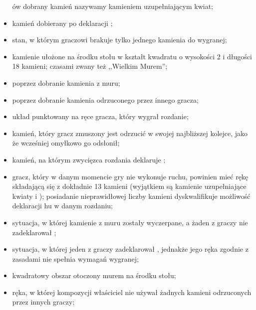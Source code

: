 \begin{itemize}
ów dobrany kamień nazywamy kamieniem uzupełniającym kwiat;
\item {}
kamień dobierany po deklaracji ;
\item {}
stan, w którym graczowi brakuje tylko jednego kamienia do wygranej;
\item {}
kamienie ułożone na środku stołu w kształt kwadratu o wysokości 2 i długości 18
kamieni; czasami zwany też ,,Wielkim Murem'';
\item {}
\hu  poprzez dobranie kamienia z muru;
\item {}
\hu  poprzez dobranie kamienia odrzuconego przez innego gracza;
\item {}
układ punktowany na ręce gracza, który wygrał rozdanie;
\item {}
kamień, który gracz zmuszony jest odrzucić w swojej najbliższej kolejce, jako że
wcześniej omyłkowo go odsłonił;
\item {}
kamień, na którym zwycięzca rozdania deklaruje \hu; 
\item {}
gracz, który w danym momencie gry nie wykonuje ruchu, powinien mieć rękę
składającą się z dokładnie 13 kamieni (wyjątkiem są kamienie uzupełniające
kwiaty i ); posiadanie nieprawidłowej liczby kamieni
dyskwalifikuje możliwość deklaracji hu w danym rozdaniu;
\item {}
sytuacja, w której kamienie z muru zostały wyczerpane, a żaden z graczy nie
zadeklarował \huend;
\item {}
sytuacja, w której jeden z graczy zadeklarował \huend, jednakże jego ręka
zgodnie z zasadami nie spełnia wymagań wygranej;
\item {}
kwadratowy obszar otoczony murem na środku stołu;
\item {}
ręka, w której kompozycji właściciel nie używał żadnych kamieni odrzuconych
przez innych graczy;
\end{itemize}

